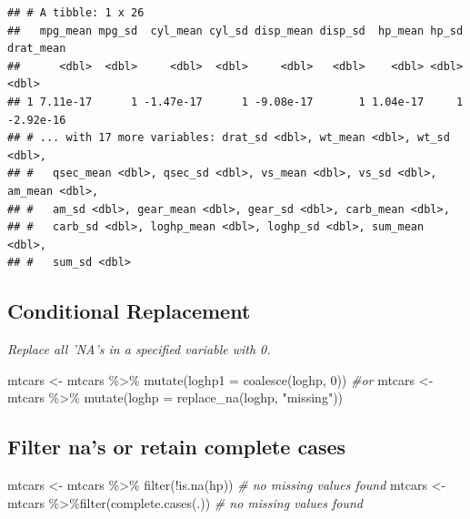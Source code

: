 \documentclass[
]{article}
\newenvironment{Shaded}{\begin{snugshade}}{\end{snugshade}}
\newcommand{\AttributeTok}[1]{\textcolor[rgb]{0.77,0.63,0.00}{#1}}
\newcommand{\CommentTok}[1]{\textcolor[rgb]{0.56,0.35,0.01}{\textit{#1}}}
\newcommand{\DecValTok}[1]{\textcolor[rgb]{0.00,0.00,0.81}{#1}}
\newcommand{\FunctionTok}[1]{\textcolor[rgb]{0.00,0.00,0.00}{#1}}
\newcommand{\NormalTok}[1]{#1}
\newcommand{\OtherTok}[1]{\textcolor[rgb]{0.56,0.35,0.01}{#1}}
\newcommand{\SpecialCharTok}[1]{\textcolor[rgb]{0.00,0.00,0.00}{#1}}
\newcommand{\StringTok}[1]{\textcolor[rgb]{0.31,0.60,0.02}{#1}}
\begin{document}
\begin{verbatim}
## # A tibble: 1 x 26
##   mpg_mean mpg_sd  cyl_mean cyl_sd disp_mean disp_sd  hp_mean hp_sd drat_mean
##      <dbl>  <dbl>     <dbl>  <dbl>     <dbl>   <dbl>    <dbl> <dbl>     <dbl>
## 1 7.11e-17      1 -1.47e-17      1 -9.08e-17       1 1.04e-17     1 -2.92e-16
## # ... with 17 more variables: drat_sd <dbl>, wt_mean <dbl>, wt_sd <dbl>,
## #   qsec_mean <dbl>, qsec_sd <dbl>, vs_mean <dbl>, vs_sd <dbl>, am_mean <dbl>,
## #   am_sd <dbl>, gear_mean <dbl>, gear_sd <dbl>, carb_mean <dbl>,
## #   carb_sd <dbl>, loghp_mean <dbl>, loghp_sd <dbl>, sum_mean <dbl>,
## #   sum_sd <dbl>
\end{verbatim}

\hypertarget{conditional-replacement}{%
\subsection{Conditional Replacement}\label{conditional-replacement}}

\emph{Replace all 'NA's in a specified variable with 0.}

\begin{Shaded}
\begin{Highlighting}[]
\NormalTok{mtcars }\OtherTok{\textless{}{-}}\NormalTok{ mtcars }\SpecialCharTok{\%\textgreater{}\%} \FunctionTok{mutate}\NormalTok{(}\AttributeTok{loghp1 =} \FunctionTok{coalesce}\NormalTok{(loghp, }\DecValTok{0}\NormalTok{))}
\CommentTok{\#or}
\NormalTok{mtcars }\OtherTok{\textless{}{-}}\NormalTok{ mtcars }\SpecialCharTok{\%\textgreater{}\%} \FunctionTok{mutate}\NormalTok{(}\AttributeTok{loghp =} \FunctionTok{replace\_na}\NormalTok{(loghp, }\StringTok{"missing"}\NormalTok{))}
\end{Highlighting}
\end{Shaded}

\hypertarget{filter-nas-or-retain-complete-cases}{%
\subsection{Filter na's or retain complete cases}\label{filter-nas-or-retain-complete-cases}}

\begin{Shaded}
\begin{Highlighting}[]
\NormalTok{mtcars }\OtherTok{\textless{}{-}}\NormalTok{ mtcars }\SpecialCharTok{\%\textgreater{}\%} \FunctionTok{filter}\NormalTok{(}\SpecialCharTok{!}\FunctionTok{is.na}\NormalTok{(hp)) }\CommentTok{\# no missing values found}
\NormalTok{mtcars }\OtherTok{\textless{}{-}}\NormalTok{ mtcars }\SpecialCharTok{\%\textgreater{}\%}\FunctionTok{filter}\NormalTok{(}\FunctionTok{complete.cases}\NormalTok{(.)) }\CommentTok{\# no missing values found}
\end{Highlighting}
\end{Shaded}
\end{document}
